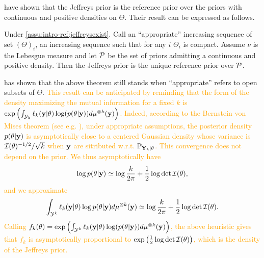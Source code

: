 \citet{clarke_jeffreys_1994} have shown that the Jeffreys prior  is the reference prior over the priors with continuous and positive densities on $\Theta$. Their result can be expressed as follows.
    \begin{thm}\label{thm:intro-ref:clarke}
        Under \cref{assu:intro-ref:jeffreysexist}. Call an ``appropriate'' increasing sequence of set $(\Theta)_i$, an increasing sequence such that for any $i$ $\Theta_i$ is compact. Assume $\nu$ is the Lebesgue measure and let $\mathcal{P}$ be the set of priors admitting a continuous and positive density. Then the Jeffreys prior is the unique reference prior over $\mathcal{P}$.
    \end{thm}
\citet{mure_objective_2018} has shown that the above theorem still stands when ``appropriate'' refers to open subsets of $\Theta$. \textcolor{orange}{This result can be anticipated by reminding that the form of the density maximizing the mutual information for a fixed $k$ is $\exp\left(\int_{\mathcal{Y}_k}\ell_k(\mathbf{y}|\theta)\log(p(\theta|\mathbf{y}) ) d\mu^{\otimes k}(\mathbf{y})\right)$. 
Indeed, according to the Bernstein von Mises theorem (see e.g. \cite{van_der_vaart_asymptotic_1992}), under appropriate assumptions, the posterior density $p(\theta|\mathbf{y})$ is asymptotically close  to a %
centered Gaussian density whose  variance is $\mathcal{I}(\theta)^{-1/2}/\sqrt{k}$ when $\mathbf{y}$ are sitributed w.r.t. $\mathbb{P}_{\mathbf{Y}_k|\theta}$.
This convergence does not depend {on} the prior. We thus asymptotically have
    \begin{equation}
        \log p(\theta|\mathbf{y})\simeq \log \frac{k}{2\pi}  +\frac{1}{2}\log\det\mathcal{I}(\theta),
    \end{equation}
and we approximate
\begin{equation}
    \int_{\mathcal{Y}^k} \ell_k(\mathbf{y}|\theta)\log p(\theta|\mathbf{y}) d\mu^{\otimes k}(\mathbf{y})\simeq \log\frac{k}{2\pi} + \frac{1}{2}\log\det\mathcal{I}(\theta).
\end{equation}
Calling $f_k(\theta) = \exp\left(\int_{\mathcal{Y}^k}\ell_k(\mathbf{y}|\theta)\log(p(\theta|\mathbf{y}))d\mu^{\otimes k}(\mathbf{y})  \right)$, the above heuristic gives that $f_k$ is asymptotically proportional to $\exp\left(\frac{1}{2}\log\det\mathcal{I}(\theta)\right)$, which is the density of the Jeffreys prior.}



